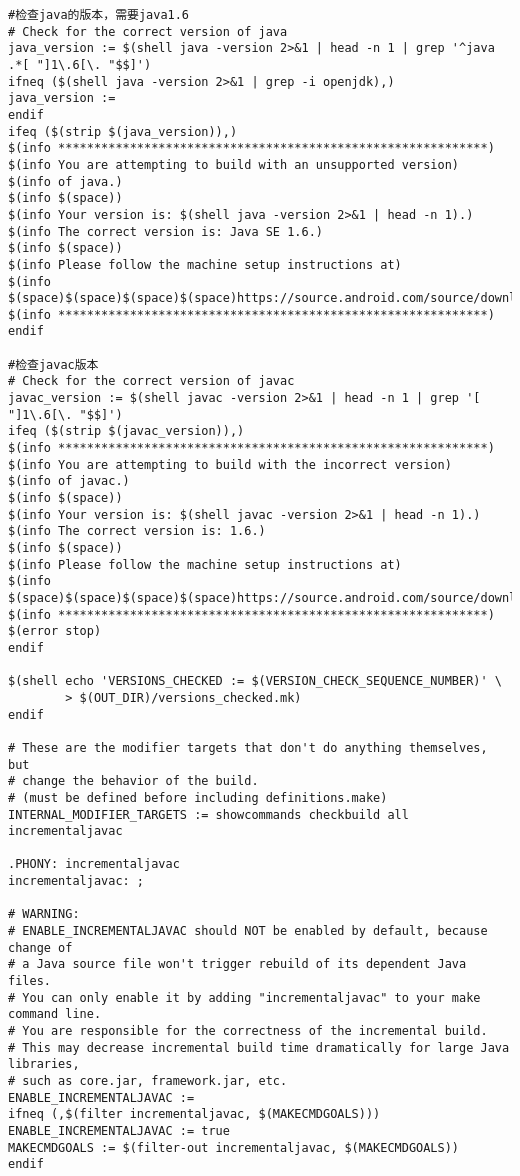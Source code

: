 \documentclass[12pt,a4paper]{article}
\begin{document}
\begin{verbatim}
#检查java的版本，需要java1.6
# Check for the correct version of java
java_version := $(shell java -version 2>&1 | head -n 1 | grep '^java .*[ "]1\.6[\. "$$]')
ifneq ($(shell java -version 2>&1 | grep -i openjdk),)
java_version :=
endif
ifeq ($(strip $(java_version)),)
$(info ************************************************************)
$(info You are attempting to build with an unsupported version)
$(info of java.)
$(info $(space))
$(info Your version is: $(shell java -version 2>&1 | head -n 1).)
$(info The correct version is: Java SE 1.6.)
$(info $(space))
$(info Please follow the machine setup instructions at)
$(info $(space)$(space)$(space)$(space)https://source.android.com/source/download.html)
$(info ************************************************************)
endif

#检查javac版本
# Check for the correct version of javac
javac_version := $(shell javac -version 2>&1 | head -n 1 | grep '[ "]1\.6[\. "$$]')
ifeq ($(strip $(javac_version)),)
$(info ************************************************************)
$(info You are attempting to build with the incorrect version)
$(info of javac.)
$(info $(space))
$(info Your version is: $(shell javac -version 2>&1 | head -n 1).)
$(info The correct version is: 1.6.)
$(info $(space))
$(info Please follow the machine setup instructions at)
$(info $(space)$(space)$(space)$(space)https://source.android.com/source/download.html)
$(info ************************************************************)
$(error stop)
endif

$(shell echo 'VERSIONS_CHECKED := $(VERSION_CHECK_SEQUENCE_NUMBER)' \
        > $(OUT_DIR)/versions_checked.mk)
endif

# These are the modifier targets that don't do anything themselves, but
# change the behavior of the build.
# (must be defined before including definitions.make)
INTERNAL_MODIFIER_TARGETS := showcommands checkbuild all incrementaljavac

.PHONY: incrementaljavac
incrementaljavac: ;

# WARNING:
# ENABLE_INCREMENTALJAVAC should NOT be enabled by default, because change of
# a Java source file won't trigger rebuild of its dependent Java files.
# You can only enable it by adding "incrementaljavac" to your make command line.
# You are responsible for the correctness of the incremental build.
# This may decrease incremental build time dramatically for large Java libraries,
# such as core.jar, framework.jar, etc.
ENABLE_INCREMENTALJAVAC :=
ifneq (,$(filter incrementaljavac, $(MAKECMDGOALS)))
ENABLE_INCREMENTALJAVAC := true
MAKECMDGOALS := $(filter-out incrementaljavac, $(MAKECMDGOALS))
endif


\end{verbatim}
\end{document}
